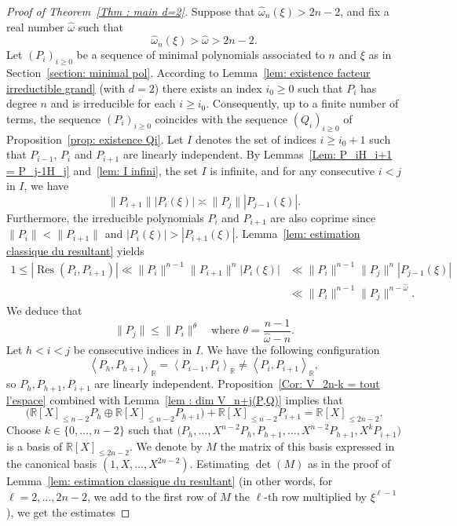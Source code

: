 \documentclass[10pt,a4paper]{amsart}
\numberwithin{equation}{section}
\DeclareMathOperator\Res{Res}
\newcommand\bR{\mathbb{R}}
\newcommand\homega{\widehat{\omega}}\newcommand\HH{\mathcal{H}}
\newcommand{\normH}[1]{\|#1\|}
\newcommand{\Vect}[2][]{\left\la #2\right\ra_{#1}}
\let\la\langle
\let\ra\rangle
\theoremstyle{definition}
\theoremstyle{plain}
\begin{document}
\begin{proof}[Proof of Theorem~\ref{Thm : main d=2}]
Suppose that $\homega_n(\xi) > 2n-2$, and fix a real number $\homega$ such that
\[
\homega_n(\xi) > \homega > 2n-2.
\]
Let $(P_i)_{i\geq 0}$ be a sequence of minimal polynomials associated to $n$ and $\xi$ as in Section~\ref{section: minimal pol}. According to Lemma~\ref{lem: existence facteur irreductible grand} (with $d=2$) there exists an index $i_0\geq 0$ such that $P_i$ has degree $n$ and is irreducible for each $i\geq i_0$. Consequently, up to a finite number of terms, the sequence $(P_i)_{i\geq 0}$ coincides with the sequence $(Q_i)_{i\geq 0}$ of Proposition~\ref{prop: existence Qi}. Let $I$ denotes the set of indices $i\geq i_0+1$ such that $P_{i-1}$, $P_i$ and $P_{i+1}$ are linearly independent. By Lemmas~\ref{Lem: P_iH_i+1 = P_j-1H_j} and~\ref{lem: I infini}, the set $I$ is infinite, and for any consecutive $i<j$ in $I$, we have
\[
\normH{P_{i+1}}|P_i(\xi)| \asymp \normH{P_j}|P_{j-1}(\xi)|.
\]
Furthermore, the irreducible polynomials $P_i$ and $P_{i+1}$ are also coprime since $\normH{P_i} < \normH{P_{i+1}}$ and $|P_i(\xi)| > |P_{i+1}(\xi)|$. Lemma~\ref{lem: estimation classique du resultant} yields
\begin{align*}
1 \leq |\Res(P_i,P_{i+1})| \ll \normH{P_i}^{n-1}\normH{P_{i+1}}^n|P_{i}(\xi)| &\ll \normH{P_i}^{n-1}\normH{P_{j}}^n|P_{j-1}(\xi)| \\
& \ll \normH{P_i}^{n-1}\normH{P_{j}}^{n-\homega}.
\end{align*}
We deduce that
\begin{equation}
\label{eq proof: estimation theta}
\normH{P_{j}} \leq \normH{P_i}^\theta \quad \textrm{where } \theta = \frac{n-1}{\homega-n}.
\end{equation}
Let $h<i<j$ be consecutive indices in $I$. We have the following configuration
\[
\Vect[\bR]{P_h,P_{h+1}} = \Vect[\bR]{P_{i-1},P_{i}} \neq \Vect[\bR]{P_{i},P_{i+1}},
\]
so $P_{h}, P_{h+1}, P_{i+1}$ are linearly independent. Proposition~\ref{Cor: V_2n-k = tout l'espace} combined with Lemma~\ref{lem : dim V_n+j(P,Q)} implies that
\begin{equation*}
\Big(\bR[X]_{\leq n-2}P_{h}\oplus \bR[X]_{\leq n-2}P_{h+1}\Big) + \bR[X]_{\leq n-2}P_{i+1} = \bR[X]_{\leq 2n-2}.
\end{equation*}
Choose $k\in\{0,\dots,n-2\}$ such that $\big(P_{h},\dots,X^{n-2}P_{h},P_{h+1},\dots,X^{n-2}P_{h+1}, X^kP_{i+1}\big)$ is a basis of $\bR[X]_{\leq 2n-2}$. We denote by $M$ the matrix of this basis expressed in the canonical basis $(1,X,\dots,X^{2n-2})$. Estimating $\det(M)$ as in the proof of Lemma~\ref{lem: estimation classique du resultant} (in other words, for $\ell=2,\dots,2n-2$, we add to the first row of $M$ the $\ell$-th row multiplied by $\xi^{\ell-1}$), we get the estimates

\end{proof}
\end{document}
